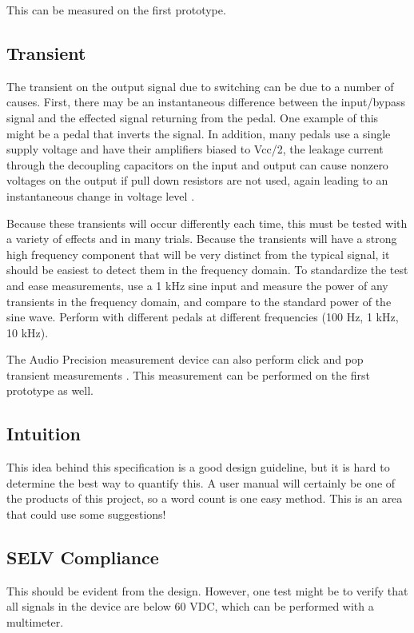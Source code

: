 \documentclass{article}
\begin{document}
	This can be measured on the first prototype.

	\subsection{Transient}
	The transient on the output signal due to switching can be due to a number of causes.  First, there may be an instantaneous difference between the input/bypass signal and the effected signal returning from the pedal.  One example of this might be a pedal that inverts the signal.  In addition, many pedals use a single supply voltage and have their amplifiers biased to Vcc/2, the leakage current through the decoupling capacitors on the input and output can cause nonzero voltages on the output if pull down resistors are not used, again leading to an instantaneous change in voltage level \cite{OrmanBypassMeasurements}.

	Because these transients will occur differently each time, this must be tested with a variety of effects and in many trials.  Because the transients will have a strong high frequency component that will be very distinct from the typical signal, it should be easiest to detect them in the frequency domain.  To standardize the test and ease measurements, use a 1 kHz sine input and measure the power of any transients in the frequency domain, and compare to the standard power of the sine wave.  Perform with different pedals at different frequencies (100 Hz, 1 kHz, 10 kHz).

	The Audio Precision measurement device can also perform click and pop transient measurements \cite{APclickpopmeasurement}.  This measurement can be performed on the first prototype as well.

	\subsection{Intuition}
	This idea behind this specification is a good design guideline, but it is hard to determine the best way to quantify this.  A user manual will certainly be one of the products of this project, so a word count is one easy method.  This is an area that could use some suggestions!

	\subsection{SELV Compliance}
	This should be evident from the design.  However, one test might be to verify that all signals in the device are below 60 VDC, which can be performed with a multimeter.
\end{document}
